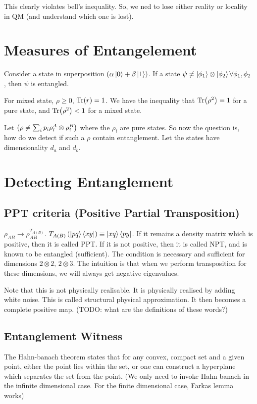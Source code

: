 This clearly violates bell's inequality. So, we ned to lose either reality or
locality in QM (and understand which one is lost).

\section{Measures of Entangelement}
Consider a state in superposition $(\alpha \ket{0} + \beta \ket{1})$. If a state
$\psi \neq \ket{\phi_1} \otimes \ket{\phi_2} \forall \phi_1, \phi_2$, then $\psi$ is entangled.

For mixed state, $\rho \geq 0$, $\Tr(r) = 1$. We have the inequality that
$\Tr(\rho^2) = 1$ for a pure state, and $\Tr(\rho^2) < 1 $ for a mixed state.

Let $\left( \rho \neq \sum_i p_i \rho_i^A \otimes \rho_i^B \right)$ where the $\rho_i$ are
pure states. So now the question is, how do we detect if such a $\rho$ contain
entanglement. Let the states have dimensionality $d_a$ and $d_b$. 

\section{Detecting Entanglement}

\subsection{PPT criteria (Positive Partial Transposition)}
$\rho_{AB} \rightarrow \rho_{AB}^{T_{A(B)}}$.
$T_{A(B)}\left( \ket{pq}\bra{xy} \right) \equiv \ket{xq}\bra{py}$.  If it remains
a density matrix which is positive, then it is called PPT. If it 
is not positive, then it is called NPT, and is known to be entangled (sufficient).
The condition is necessary and sufficient for dimensions $2 \otimes 2$, $2 \otimes 3$.
The intuition is that when we perform transposition for these dimensions, we will
always get negative eigenvalues. 

Note that this is not physically realisable. It is physically realised by
adding white noise. This is called structural physical approximation.
It then becomes a complete positive map. (TODO: what are
the definitions of these words?)

\subsection{Entanglement Witness}
The Hahn-banach theorem states that for any convex, compact set and a given point,
either the point lies within the set, or one can construct a hyperplane which
separates the set from the point. (We only need to invoke Hahn banach 
in the infinite dimensional case. For the finite dimensional case, Farkas
lemma works)

